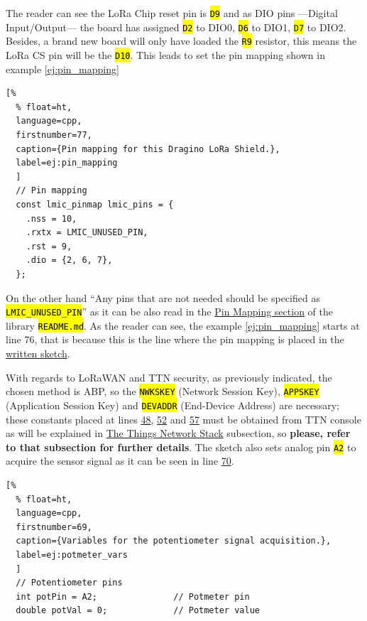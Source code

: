 \documentclass[11pt,a4paper,dvipsnames,twoside]{article}
\newcommand{\cmd}[1] {\hl{\texttt{#1}}}
\begin{document}
The reader can see the LoRa Chip reset pin is \cmd{D9} and as DIO pins ---Digital Input/Output--- the board has assigned \cmd{D2} to DIO0, \cmd{D6} to DIO1, \cmd{D7} to DIO2. Besides, a brand new board will only have loaded the \cmd{R9} resistor, this means the LoRa CS pin will be the \cmd{D10}. This leads to set the pin mapping shown in example \ref{ej:pin_mapping}

\begin{lstlisting}[%
  % float=ht,
  language=cpp,
  firstnumber=77,
  caption={Pin mapping for this Dragino LoRa Shield.},
  label=ej:pin_mapping
  ]
  // Pin mapping
  const lmic_pinmap lmic_pins = {
    .nss = 10,
    .rxtx = LMIC_UNUSED_PIN,
    .rst = 9,
    .dio = {2, 6, 7},
  };
\end{lstlisting}

On the other hand \enquote{Any pins that are not needed should be specified as \cmd{LMIC\_UNUSED\_PIN}} as it can be also read in the \href{https://github.com/mcci-catena/arduino-lmic#pin-mapping}{Pin Mapping section} of the library \cmd{README.md}. As the reader can see, the example \ref{ej:pin_mapping} starts at line 76, that is because this is the line where the pin mapping is placed in the \href{https://github.com/WyRe/lora-arduino-dendrometer/blob/master/src/arduino/dendro/dendro.ino#L76}{written sketch}.

With regards to LoRaWAN and TTN security, as previously indicated, the chosen method is ABP, so the \cmd{NWKSKEY} (Network Session Key), \cmd{APPSKEY} (Application Session Key) and \cmd{DEVADDR} (End-Device Address) are necessary; these constants placed at lines \href{https://github.com/WyRe/lora-arduino-dendrometer/blob/master/src/arduino/dendro/dendro.ino#L48}{48}, \href{https://github.com/WyRe/lora-arduino-dendrometer/blob/master/src/arduino/dendro/dendro.ino#L52}{52} and \href{https://github.com/WyRe/lora-arduino-dendrometer/blob/master/src/arduino/dendro/dendro.ino#L57}{57} must be obtained from TTN console as will be explained in \hyperref[sssec:TTN_Stack]{The Things Network Stack} subsection, so \textbf{please, refer to that subsection for further details}. The sketch also sets analog pin \cmd{A2} to acquire the sensor signal as it can be seen in line \href{https://github.com/WyRe/lora-arduino-dendrometer/blob/master/src/arduino/dendro/dendro.ino#L70}{70}.%

\begin{lstlisting}[%
  % float=ht,
  language=cpp,
  firstnumber=69,
  caption={Variables for the potentiometer signal acquisition.},
  label=ej:potmeter_vars
  ]
  // Potentiometer pins
  int potPin = A2;               // Potmeter pin
  double potVal = 0;             // Potmeter value
\end{lstlisting}
\end{document}
